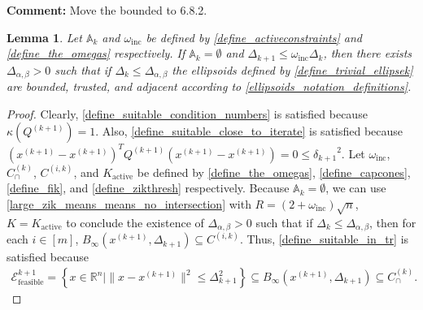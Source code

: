 \documentclass{article}
\newenvironment{comment}
  {\par\medskip
   \color{red}%
   \begin{framed}
   \textbf{Comment: }\ignorespaces}
 {\end{framed}
  \medskip}
\newtheorem{lemma}[theorem]{Lemma}
\theoremstyle{case}
\numberwithin{theorem}{subsection}
\newcommand{\activeconstraintsk}{{\mathbb A_{k}}}
\newcommand{\capcones}{{C^{(k)}_{\cap}}}
\newcommand{\deltalargzik}{{\Delta_{\alpha,\beta}}}
\newcommand{\dk}{\Delta_k}
\newcommand{\dkpo}{\Delta_{k+1}}
\newcommand{\hgik}{{\frac{\nabla m^{(k)}_{c_i}(\xk)}{\|\nabla m^{(k)}_{c_i}\left(\xk\right)\|}}}
\newcommand{\omegainc}{\omega_{\text{inc}}}
\newcommand{\Rn}{\mathbb R^n}
\newcommand{\trkpo}{{ B_{\infty}\left(\xkpo, \dkpo\right) }}
\newcommand{\xkpo}{{{x}^{(k+1)}}}
\newcommand{\xk}{x^{(k)}}
\newcommand{\zik}{{z^{(i, k)}}}
\newcommand{\qkpo}{{Q^{(k+1)}}}
\newcommand{\sdkpo}{{\delta_{k+1}}}
\newcommand{\unshiftedellipsoidkpo}{{\mathcal E^{k+1}_{\textrm{feasible}}}}
\newcommand{\fik}{{C^{(i, k)}}}
\newcommand{\zikthresh}{{ K_{\textrm{active}} }}
\begin{document}


\begin{comment}
Move the bounded to 6.8.2.
\end{comment}

\begin{lemma}
\label{ellsoid_is_suitable_theorem_p1}
Let $\activeconstraintsk$ and $\omegainc$ be defined by \cref{define_activeconstraints} and \cref{define_the_omegas} respectively.
If $\activeconstraintsk = \emptyset$ and $\dkpo \le \omegainc\dk$, 
then there exists $\deltalargzik>0$ such that if $\dk \le \deltalargzik$ the
ellipsoids defined by \cref{define_trivial_ellipsek} 
are bounded, trusted, and adjacent according to \cref{ellipsoids_notation_definitions}.

\end{lemma}
\begin{proof}
Clearly, \cref{define_suitable_condition_numbers} is satisfied because $\kappa(\qkpo) = 1$.
Also, \cref{define_suitable_close_to_iterate} is satisfied because $(\xkpo - \xkpo)^T\qkpo(\xkpo - \xkpo) = 0 \le \sdkpo^2$.
Let $\omegainc$, $\capcones$, $\fik$, and $\zikthresh$ be defined by \cref{define_the_omegas}, \cref{define_capcones}, \cref{define_fik}, and \cref{define_zikthresh} respectively.
Because $\activeconstraintsk = \emptyset$, we can use 
\cref{large_zik_means_means_no_intersection} with $R = (2 + \omegainc)\sqrt{n}$, $K = \zikthresh$ to conclude the existence of $\deltalargzik > 0$ such that 
if $\dk \le \deltalargzik$, then for each 
$i \in [m]$, $\trkpo \subseteq \fik$.
Thus, \cref{define_suitable_in_tr} is satisfied because 
\begin{align*}
\unshiftedellipsoidkpo = \left\{x \in \Rn \bigg| \|x - \xkpo\|^2 \le \dkpo^2 \right\} \subseteq \trkpo \subseteq \capcones.
\end{align*}
\end{proof}
\end{document}
